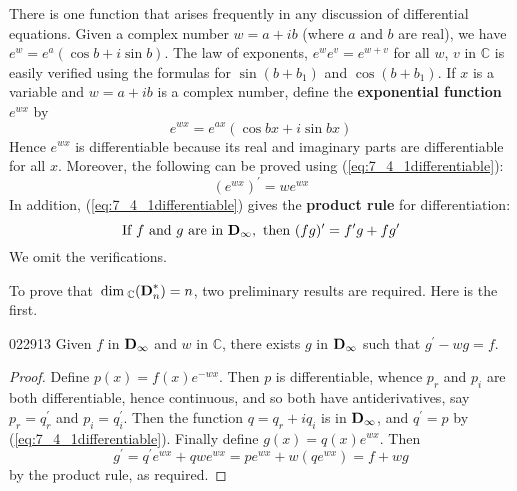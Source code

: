 There is one function that arises frequently in any discussion of differential equations. Given a complex number $w = a + ib$ (where $a$ and $b$ are real), we have $e^{w} = e^{a}(\cos b + i\sin b)$. The law of exponents, $e^{w}e^{v} = e^{w+v}$ for all $w$, $v$ in $\mathbb{C}$  is easily verified using the formulas for $\sin(b + b_{1})$ and $\cos(b + b_{1})$. If $x$ is a variable and $w = a + ib$ is a complex number, define the \textbf{exponential function} $e^{wx}$ by
\begin{equation*}
e^{wx} = e^{ax}(\cos bx + i\sin bx)
\end{equation*}
Hence $e^{wx}$ is differentiable because its real and imaginary parts are differentiable for all $x$. Moreover, the following can be proved using (\ref{eq:7_4_1differentiable}):
\begin{equation*}
(e^{wx})^\prime = we^{wx}
\end{equation*}
In addition, (\ref{eq:7_4_1differentiable}) gives the \textbf{product rule} for differentiation:
\begin{equation*}
\mbox{If } f \mbox{ and } g \mbox{ are in } \textbf{D}_\infty, \mbox{ then } (fg)^\prime = f^\prime g + fg^\prime
\end{equation*}
We omit the verifications.


To prove that $\thinspace\operatorname{dim\medspace}_{\mathbb{C}}(\textbf{D}_{n}^{*}) = n$, two preliminary results are required. Here is the first.


\begin{lemma}{}{022913}
Given $f$ in $\textbf{D}_{\infty}$ and $w$ in $\mathbb{C}$, there exists $g$ in $\textbf{D}_{\infty}$ such that $g^\prime - wg = f$.
\end{lemma}

\begin{proof}
Define $p(x) = f(x)e^{-wx}$. Then $p$ is differentiable, whence $p_{r}$ and $p_{i}$ are both differentiable, hence continuous, and so both have antiderivatives, say $p_{r} = q_{r}^\prime$ and $p_{i} = q_{i}^\prime$. Then the function $q = q_{r} + iq_{i}$ is in $\textbf{D}_{\infty}$, and $q^\prime = p$ by (\ref{eq:7_4_1differentiable}). Finally define $g(x) = q(x)e^{wx}$. Then 
\begin{equation*}
g^\prime = q^{\prime}e^{wx} + qwe^{wx} = pe^{wx} + w(qe^{wx}) = f + wg
\end{equation*}
 by the product rule, as required.
\end{proof}

